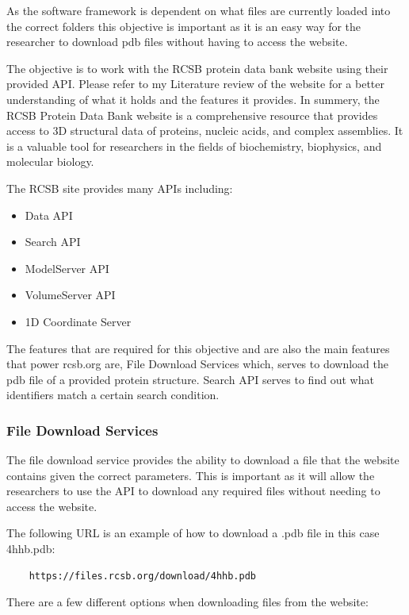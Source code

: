 \documentclass[]{final_report}
\begin{document}
As the software framework is dependent on what files are currently loaded into the correct folders this objective is important as it is an easy way for the researcher to download pdb files without having to access the website.

The objective is to work with the RCSB protein data bank website using their provided API. Please refer to my Literature review of the website for a better understanding of what it holds and the features it provides. In summery, the RCSB Protein Data Bank website is a comprehensive resource that provides access to 3D structural data of proteins, nucleic acids, and complex assemblies. It is a valuable tool for researchers in the fields of biochemistry, biophysics, and molecular biology.

The RCSB site provides many APIs including:
\begin{itemize}
    \item Data API
    \item Search API
    \item ModelServer API
    \item VolumeServer API
    \item 1D Coordinate Server
\end{itemize}

The features that are required for this objective and are also the main features that power rcsb.org are, File Download Services which, serves to download the pdb file of a provided protein structure. Search API serves to find out what identifiers match a certain search condition.

\clearpage

\subsubsection{File Download Services}

The file download service provides the ability to download a file that the website contains given the correct parameters. This is important as it will allow the researchers to use the API to download any required files without needing to access the website. 

The following URL is an example of how to download a .pdb file in this case 4hhb.pdb:

\begin{lstlisting}
    https://files.rcsb.org/download/4hhb.pdb
\end{lstlisting}

There are a few different options when downloading files from the website:
\end{document}

